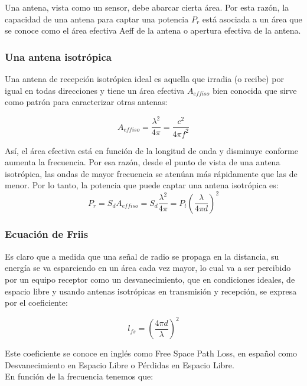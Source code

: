 Una antena, vista como un sensor, debe abarcar cierta área. Por esta razón, la capacidad de una antena para captar una potencia $P_r$ está asociada a un área que se conoce como el área efectiva Aeff de la antena o apertura efectiva de la antena.

\subsubsection{Una antena isotrópica} 

Una antena de recepción isotrópica ideal es aquella que irradia (o recibe) por igual en todas direcciones y tiene un área efectiva $A_{effiso}$ bien conocida que sirve como patrón para caracterizar otras antenas:

\begin{equation} \label{equ_cincuenta}
	A_{effiso} =\dfrac{\lambda^{2}}{4 \pi}= \frac{c^{2}}{4\pi f^{2}} 
\end{equation}

Así, el área efectiva está en función de la longitud de onda y disminuye conforme aumenta la frecuencia. Por esa razón, desde el punto de vista de una antena isotrópica, las ondas de mayor frecuencia se atenúan más rápidamente que las de menor. Por lo tanto, la potencia que puede captar una antena isotrópica es: \\

\begin{equation} \label{equ_cincuenta_uno}
	P_r= S_d A_{effiso}= S_d \dfrac{\lambda^{2}}{4 \pi} =  P_t \left(\dfrac{\lambda}{4 \pi d}\right)^{2}
\end{equation}

\subsubsection{Ecuación de Friis}

Es claro que a medida que una  señal de radio se propaga en la distancia, su energía se va esparciendo en un área cada vez mayor, lo cual va a ser percibido por un equipo receptor como un desvanecimiento, que en condiciones ideales, de espacio libre y usando antenas isotrópicas en transmisión y recepción, se expresa por el coeficiente:

\begin{equation} \label{equ_cincuenta_dos}
		 l_{fs}=  \left(\dfrac{4 \pi d}{\lambda} \right)  ^{2}
\end{equation}

Este coeficiente se conoce en inglés como Free Space Path Loss, en español como  Desvanecimiento en Espacio Libre o Pérdidas en Espacio Libre.\\
En función de la frecuencia tenemos que:

